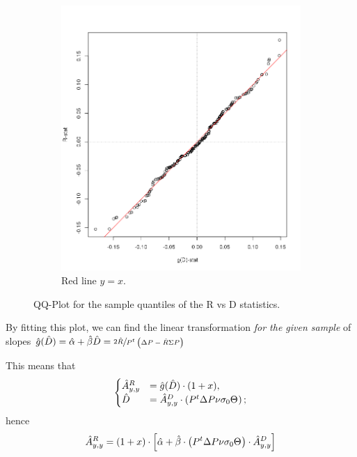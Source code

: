 \documentclass{article}
\newcommand{\err}{\epsilon}
\begin{document}
\begin{figure}[h]
\begin{subfigure}{.5\textwidth}
\includegraphics[scale=.5]{R_gD_QQPlot}
\caption{Red line $y = x$.}
\end{subfigure}
\caption{QQ-Plot for the sample quantiles of the R vs D statistics.\label{fig:QQPlot_DR}}
\end{figure}

By fitting this plot, we can find the linear transformation \emph{for the given sample} of slopes $\g*(\D*) = \hat\alpha + \hat\beta\D* = \sfrac{2\R*}{P^t\bkt{\DP - \R*\SP}}$

This means that
\begin{equation*}
\begin{cases}
	\Ayy*[R] &= \g*(\D*)\cdot(1+x), \\
	\D* 	 &= \Ayy*[D]\cdot\bkt{P^t\DP\nu\CS[0]\Thick};
\end{cases}
\end{equation*}
hence
\[
	\Ayy*[R] = (1+x) \cdot \bkt*{\hat\alpha + \hat\beta\cdot\bkt{P^t\DP\nu\CS[0]\Thick}\cdot\Ayy*[D]}
\]

%
%
\end{document}
